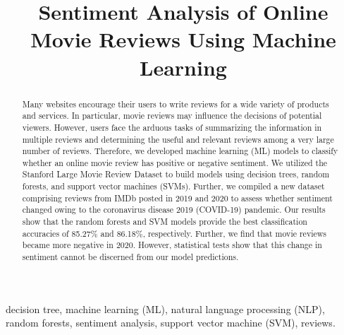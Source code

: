 \documentclass[conference]{IEEEtran}
\begin{document}
\title{Sentiment Analysis of Online Movie Reviews Using Machine Learning}

\author{
\and
{}
}

\maketitle

\begin{abstract}
Many websites encourage their users to write reviews for a wide variety of products and services. In particular, movie reviews may influence the decisions of potential viewers. However, users face the arduous tasks of summarizing the information in multiple reviews and determining the useful and relevant reviews among a very large number of reviews. Therefore, we developed machine learning (ML) models to classify whether an online movie review has positive or negative sentiment. We utilized the Stanford Large Movie Review Dataset to build models using decision trees, random forests, and support vector machines (SVMs). Further, we compiled a new dataset comprising reviews from IMDb posted in 2019 and 2020 to assess whether sentiment changed owing to the coronavirus disease 2019 (COVID-19) pandemic. Our results show that the random forests and SVM models provide the best classification accuracies of 85.27\% and 86.18\%, respectively. Further, we find that movie reviews became more negative in 2020. However, statistical tests show that this change in sentiment cannot be discerned from our model predictions.
\end{abstract}

\begin{IEEEkeywords}
decision tree, machine learning (ML), natural language processing (NLP), random forests, sentiment analysis, support vector machine (SVM), reviews.
\end{IEEEkeywords}
\end{document}
